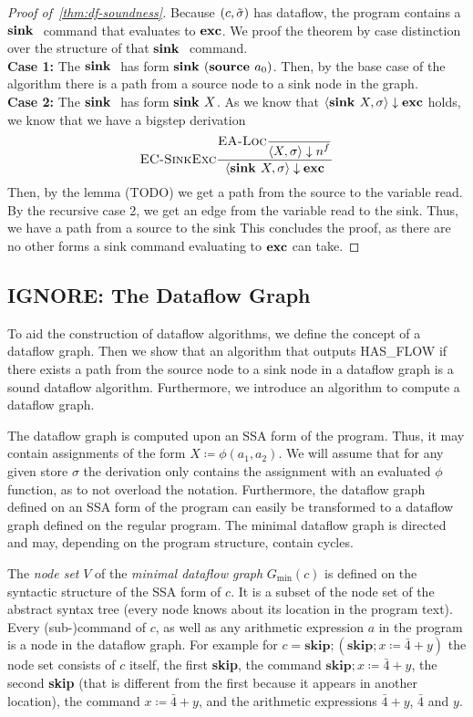 \begin{proof}[Proof of~\autoref{thm:df-soundness}]
    Because $(c, \tilde{\sigma}{})$ has dataflow, the program contains a $\textbf{sink }{}$
    command that evaluates to $\textbf{exc}$.
    We proof the theorem by case distinction over the structure of that $\textbf{sink }{}$
    command.\\
    \textbf{Case 1:}
    The $\textbf{sink }{}$ has form $\textbf{sink }{(\textbf{source }{ a_0})}$.
    Then, by the base case of the algorithm there is a path from a source node
    to a sink node in the graph.\\
    \textbf{Case 2:}
    The $\textbf{sink }{}$ has form $\textbf{sink }{X}$.
    As we know that $\langle \textbf{sink }{X}, \sigma \rangle \downarrow \textbf{exc}$ holds, we know that
    we have a bigstep derivation
    \begin{align*}
        \textsc{EC-SinkExc}\frac{\displaystyle \textsc{EA-Loc}\frac{\displaystyle }{\displaystyle \langle X, \sigma \rangle \downarrow n^f{}}}{\displaystyle \langle \textbf{sink }{X}, \sigma \rangle \downarrow \textbf{exc}}
    \end{align*}
    Then, by the lemma (TODO) we get a path from the source to the variable read.
    By the recursive case 2, we get an edge from the variable read to the sink.
    Thus, we have a path from a source to the sink
    This concludes the proof, as there are no other forms a sink command evaluating 
    to $\textbf{exc}$ can take.
\end{proof}
\iffalse
\subsection{IGNORE: The Dataflow Graph}
To aid the construction of dataflow algorithms, we define the concept
of a dataflow graph.
Then we show that an algorithm that outputs HAS\_FLOW if 
there exists a path from the source 
node to a sink node in a dataflow graph %
is a sound dataflow algorithm.
Furthermore, we introduce an algorithm to compute a dataflow graph.

The dataflow graph is computed upon an SSA form of the program.
Thus, it may contain assignments of the form $X \coloneqq \phi(a_1, a_2)$.
We will assume that for any given store $\sigma$ the derivation only contains 
the assignment with an evaluated $\phi$ function, as to not overload the notation.
Furthermore, the dataflow graph defined on an SSA form of the program can easily 
be transformed to a dataflow graph defined on the regular program.
The minimal dataflow graph is directed and may, depending on the 
program structure, contain cycles.

The \emph{node set} $V$ of the \emph{minimal dataflow graph} $G_\text{min}(c)$
is defined on the syntactic structure
of the SSA form of $c$. It is a subset of the node set of the abstract syntax tree
(every node knows about its location in the program text).
Every (sub-)command of $c$, as well as any arithmetic expression $a$ in the 
program is a node in the dataflow graph.
For example for
$c = \textbf{skip}; (\textbf{skip}; x \coloneqq \bar{4} + y)$
the node set consists of $c$ itself, the first \textbf{skip}, the command 
$\textbf{skip}; x \coloneqq \bar{4} + y$, the second \textbf{skip} (that is different 
from the first because it appears in another location), the command
$x \coloneqq \bar{4} + y$, and the arithmetic expressions $\bar{4}+y$,
$\bar{4}$ and $y$.


